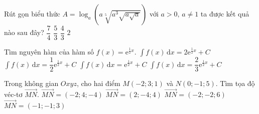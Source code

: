 \begin{ex}%
	Rút gọn biểu thức $ A=\log_a\left(a\sqrt[5]{a^3\sqrt{a\sqrt{a}}} \right)  $ với $ a>0,\, a\neq 1 $ ta được kết quả nào sau đây?
	\choice
	{\True $\dfrac{7}{4}$}
	{$\dfrac{5}{3}$}
	{$\dfrac{4}{3}$}
	{$2$}
\end{ex}

\begin{ex}%
	Tìm nguyên hàm của hàm số $ f(x)=\mathrm{e}^{\tfrac{1}{2}x} $.
	\choice
	{\True $\displaystyle\int f(x)\mathrm{\, d}x=2\mathrm{e}^{\tfrac{1}{2}x}+C$}
	{$\displaystyle\int f(x)\mathrm{\, d}x=\dfrac{1}{2}\mathrm{e}^{\tfrac{1}{2}x}+C$}
	{$\displaystyle\int f(x)\mathrm{\, d}x=\mathrm{e}^{\tfrac{1}{2}x}+C$}
	{$\displaystyle\int f(x)\mathrm{\, d}x=\dfrac{2}{3}\mathrm{e}^{\tfrac{1}{2}x}+C$}
\end{ex}

\begin{ex}%
	Trong không gian $ Oxyz $, cho hai điểm $ M(-2;3;1) $ và $ N(0;-1;5). $ Tìm tọa độ véc-tơ $ \vec{MN} $.
	\choice
	{$\vec{MN}=(-2;4;-4)$}
	{\True $\vec{MN}=(2;-4;4)$}
	{$\vec{MN}=(-2;-2;6)$}
	{$\vec{MN}=(-1;-1;3)$}
\end{ex}

